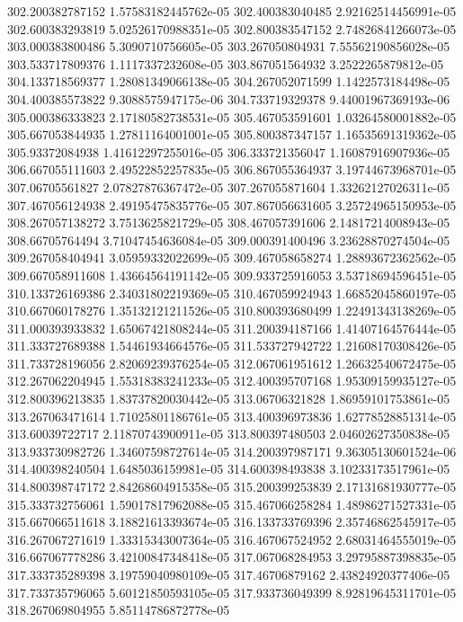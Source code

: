 {302.200382787152 1.57583182445762e-05
302.400383040485 2.92162514456991e-05
302.600383293819 5.02526170988351e-05
302.800383547152 2.74826841266073e-05
303.000383800486 5.3090710756605e-05
303.267050804931 7.55562190856028e-05
303.533717809376 1.1117337232608e-05
303.867051564932 3.2522265879812e-05
304.133718569377 1.28081349066138e-05
304.267052071599 1.1422573184498e-05
304.400385573822 9.3088575947175e-06
304.733719329378 9.44001967369193e-06
305.000386333823 2.17180582738531e-05
305.467053591601 1.03264580001882e-05
305.667053844935 1.27811164001001e-05
305.800387347157 1.16535691319362e-05
305.93372084938 1.41612297255016e-05
306.333721356047 1.16087916907936e-05
306.667055111603 2.49522852257835e-05
306.867055364937 3.19744673968701e-05
307.06705561827 2.07827876367472e-05
307.267055871604 1.33262127026311e-05
307.467056124938 2.49195475835776e-05
307.867056631605 3.25724965150953e-05
308.267057138272 3.7513625821729e-05
308.467057391606 2.14817214008943e-05
308.66705764494 3.71047454636084e-05
309.000391400496 3.23628870274504e-05
309.267058404941 3.05959332022699e-05
309.467058658274 1.28893672362562e-05
309.667058911608 1.43664564191142e-05
309.933725916053 3.53718694596451e-05
310.133726169386 2.34031802219369e-05
310.467059924943 1.66852045860197e-05
310.667060178276 1.35132121211526e-05
310.800393680499 1.22491343138269e-05
311.000393933832 1.65067421808244e-05
311.200394187166 1.41407164576444e-05
311.333727689388 1.54461934664576e-05
311.533727942722 1.21608170308426e-05
311.733728196056 2.82069239376254e-05
312.067061951612 1.26632540672475e-05
312.267062204945 1.55318383241233e-05
312.400395707168 1.95309159935127e-05
312.800396213835 1.83737820030442e-05
313.06706321828 1.86959101753861e-05
313.267063471614 1.71025801186761e-05
313.400396973836 1.62778528851314e-05
313.60039722717 2.11870743900911e-05
313.800397480503 2.04602627350838e-05
313.933730982726 1.34607598727614e-05
314.200397987171 9.36305130601524e-06
314.400398240504 1.6485036159981e-05
314.600398493838 3.10233173517961e-05
314.800398747172 2.84268604915358e-05
315.200399253839 2.17131681930777e-05
315.333732756061 1.59017817962088e-05
315.467066258284 1.48986271527331e-05
315.667066511618 3.18821613393674e-05
316.133733769396 2.35746862545917e-05
316.267067271619 1.33315343007364e-05
316.467067524952 2.68031464555019e-05
316.667067778286 3.42100847348418e-05
317.067068284953 3.29795887398835e-05
317.333735289398 3.19759040980109e-05
317.46706879162 2.43824920377406e-05
317.733735796065 5.60121850593105e-05
317.933736049399 8.92819645311701e-05
318.267069804955 5.85114786872778e-05
}
